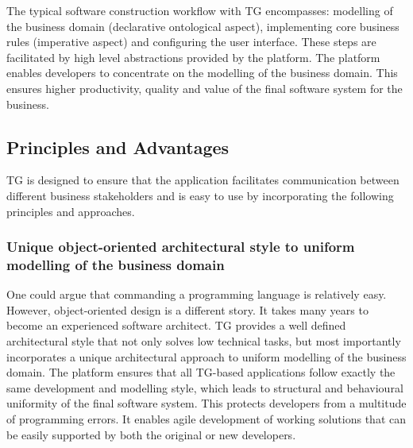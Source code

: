 \documentclass[a4paper,10pt,twocolumn,oneside,openright,final]{memoir}
\begin{document}
  \noindent The typical software construction workflow with TG encompasses: modelling of the business domain (declarative ontological aspect), implementing core business rules (imperative aspect) and configuring the user interface.
  These steps are facilitated by high level abstractions provided by the platform.
  The platform enables developers to concentrate on the modelling of the business domain. 
  This ensures higher productivity, quality and value of the final software system for the business.


 \subsection*{Principles and Advantages}
  	TG is designed to ensure that the application facilitates communication between different business stakeholders and is easy to use by incorporating the following principles and approaches.

\subsubsection*{Unique object-oriented architectural style to uniform modelling of the business domain}
	One could argue that commanding a programming language is relatively easy. 
  	However, object-oriented design is a different story.
  	It takes many years to become an experienced software architect.
  	TG provides a well defined architectural style that not only solves low technical tasks, but most importantly incorporates a unique architectural approach to uniform modelling of the business domain.
  	The platform ensures that all TG-based applications follow exactly the same development and modelling style, which leads to structural and behavioural uniformity of the final software system.
  	This protects developers from a multitude of programming errors.
	It enables agile development of working solutions that can be easily supported by both the original or new developers.
\end{document}
